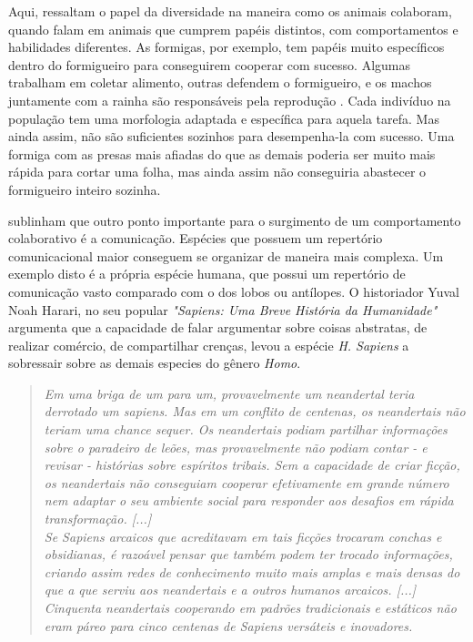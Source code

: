 Aqui,  ressaltam o papel da diversidade na maneira como os animais colaboram, quando falam em animais que cumprem papéis distintos, com comportamentos e habilidades diferentes. As formigas, por exemplo, tem papéis muito específicos dentro do formigueiro para conseguirem cooperar com sucesso. Algumas trabalham em coletar alimento, outras defendem o formigueiro, e os machos juntamente com a rainha são responsáveis pela reprodução \cite{maturana2001}. Cada indivíduo na população tem uma morfologia adaptada e específica para aquela tarefa. Mas ainda assim, não são suficientes sozinhos para desempenha-la com sucesso. Uma formiga com as presas mais afiadas do que as demais poderia ser muito mais rápida para cortar uma folha, mas ainda assim não conseguiria abastecer o formigueiro inteiro sozinha. 

 sublinham que outro ponto importante para o surgimento de um comportamento colaborativo é a comunicação. Espécies que possuem um repertório comunicacional maior conseguem se organizar de maneira mais complexa. Um exemplo disto é a própria espécie humana, que possui um repertório de comunicação vasto comparado com o dos lobos ou antílopes. O historiador Yuval Noah Harari, no seu popular \textit{"Sapiens: Uma Breve História da Humanidade"} argumenta que a capacidade de falar argumentar sobre coisas abstratas, de realizar comércio, de compartilhar crenças, levou a espécie \textit{H. Sapiens} a sobressair sobre as demais especies do gênero \textit{Homo}.

\begin{quote}
\textit{Em uma briga de um para um, provavelmente um neandertal teria derrotado um sapiens. Mas em um conflito de centenas, os neandertais não teriam uma chance sequer. Os neandertais podiam partilhar informações sobre o paradeiro de leões, mas provavelmente não podiam contar - e revisar - histórias sobre espíritos tribais. Sem a capacidade de criar ficção, os neandertais não conseguiam cooperar efetivamente em grande número nem adaptar o seu ambiente social para responder aos desafios em rápida transformação. [...] \\ Se Sapiens arcaicos que acreditavam em tais ficções trocaram conchas e obsidianas, é razoável pensar que também podem ter trocado informações, criando assim redes de conhecimento muito mais amplas e mais densas do que a que serviu aos neandertais e a outros humanos arcaicos. [...] \\
Cinquenta neandertais cooperando em padrões tradicionais e estáticos não eram páreo para cinco centenas de Sapiens versáteis e inovadores.} \cite{harari2014}
\end{quote}

